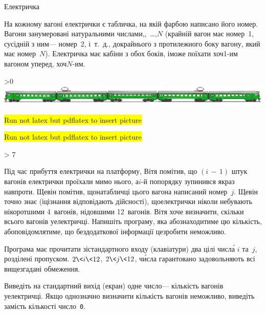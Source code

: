 \begin{problemAllDefault}{Електричка}

На кожному вагоні електрички є табличка, на якій фарбою написано його номер. Вагони занумеровані натуральними числами,,~\dots,\nolinebreak[2] $N$ (крайній вагон має номер~1, сусідній з ним\nolinebreak[3] --- номер~2, і~т.~д., до\nolinebreak[3] крайнього з протилежного боку вагону, який має номер~$N$). Електричка має кабіни з обох боків, і\nolinebreak[3] може поїхати хоч\nolinebreak[2] \mbox{1-им} вагоном уперед, хоч\nolinebreak[3] \mbox{$N$-им}.

\ifnum\pdfoutput>0
\noindent\includegraphics[width=\textwidth,keepaspectratio=true]{elTrain.png}
\else
\begin{tiny}\colorbox{yellow}{Run not latex but pdflatex to insert picture}\par\end{tiny}
\begin{small}\colorbox{yellow}{Run not latex but pdflatex to insert picture}\end{small}
\ifnum\number\month > 7 \ERROR {}\fi
\fi

Під час прибуття електрички на платформу, Вітя помітив, що ${(i\,{-}\,1)}$ штук вагонів електрички проїхали мимо нього, а\nolinebreak[2] \mbox{$i$-й} по\nolinebreak[2] порядку зупинився якраз навпроти. Ще\nolinebreak[2] він помітив, що\nolinebreak[2] на\nolinebreak[2] табличці цього вагона написаний номер~$j$. Ще\nolinebreak[2] він точно знає (і\nolinebreak[2] ці\nolinebreak[2] знання відповідають дійсності), що\nolinebreak[2] електрички ніколи не\nolinebreak[3] бувають ні\nolinebreak[3] коротшими 4~вагонів, ні\nolinebreak[3] довшими 12~вагонів. Вітя хоче визначити, скільки всього вагонів у\nolinebreak[2] електричці. Напишіть програму, яка або\nolinebreak[2] знаходитиме цю кількість, або\nolinebreak[2] повідомлятиме, що без\nolinebreak[1] додаткової інформації це\nolinebreak[1] зробити неможливо.

\InputFile
Програма має прочитати зі\nolinebreak[3] стандартного входу (клавіатури) два цілі числ\'{а} $i$ та~$j$, розділені пропуском. ${2{\<}i{\<}12}$, ${2{\<}j{\<}12}$, ч\'{и}сла гарантовано задовольняють всі вищезгадані обмеження.

\OutputFile
Виведіть на стандартний вихід (екран) одне число\nolinebreak[3] --- кількість вагонів у\nolinebreak[3] електричці. Якщо однозначно визначити кількість вагонів неможливо, виведіть замість кількості число~\texttt{0}.

\Example
%
\begin{exampleSimple}{3em}{3em}%
%
\end{exampleSimple}

\end{problemAllDefault}
